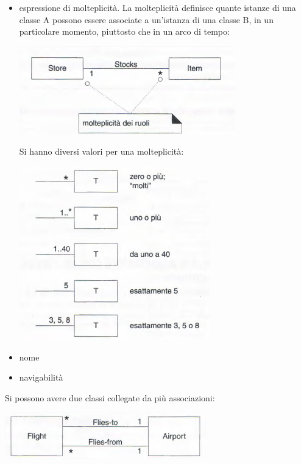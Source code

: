 \documentclass[a4paper,12pt, oneside]{book}
\begin{document}
\begin{itemize}
	\item espressione di molteplicità. La molteplicità definisce quante istanze di una classe A possono essere associate a un'istanza di una classe B, in un particolare momento, piuttosto che in un arco di tempo:
	\begin{center}
		\includegraphics[scale=0.7]{img/muld.png}
	\end{center}
	Si hanno diversi valori per una molteplicità:
	\begin{center}
		\includegraphics[scale=0.7]{img/muld2.png}
	\end{center}
	\item nome
	\item navigabilità
\end{itemize}
Si possono avere due classi collegate da più associazioni:
\begin{center}
		\includegraphics[scale=0.7]{img/muld3.png}
\end{center}
\end{document}
